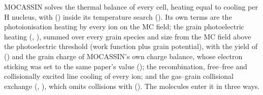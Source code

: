 MOCASSIN solves the thermal balance of every cell, heating equal to cooling
per H nucleus, with  ()
inside its temperature search  (). Its own
terms are the photoionisation heating by every ion on the MC field; the grain
photoelectric heating (,
), summed over every grain species and
size from the MC field above the photoelectric threshold (work function plus
grain potential), with the yield of \citet{WeingartnerDraine2001}
() and the grain charge of MOCASSIN's own charge balance, whose
electron sticking was set to the same paper's value (); the
recombination, free--free and collisionally excited line cooling of every ion;
and the gas--grain collisional exchange (,
), which omits collisions with \Htwo{} ().
The molecules enter it in three ways.

